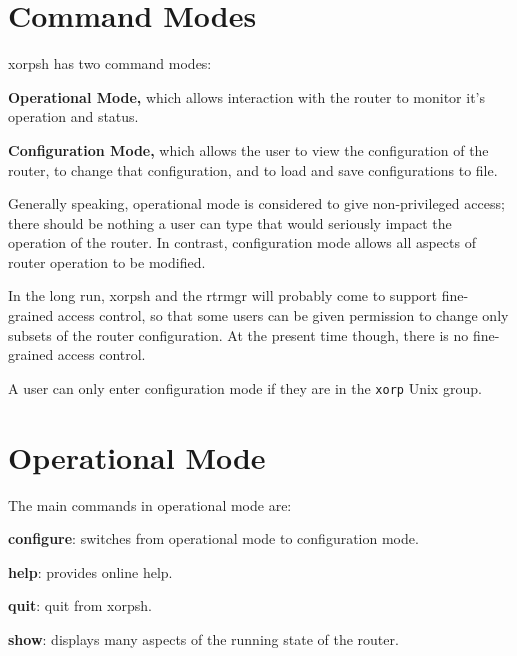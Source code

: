 \documentclass[11pt]{article}
\newcommand{\xorpsh}{{\sf\small xorpsh}\xspace}
\begin{document}
\newpage
\section{Command Modes}

\xorpsh has two command modes:
\begin{description}
\item{\bf Operational Mode,}  which allows interaction with the router
to monitor it's operation and status.
\item{\bf Configuration Mode,} which allows the user to view the
configuration of the router, to change that configuration, and to
load and save configurations to file.
\end{description}
Generally speaking, operational mode is considered to give
non-privileged access; there should be nothing a user can type that
would seriously impact the operation of the router.  In contrast,
configuration mode allows all aspects of router operation to be
modified.

In the long run, \xorpsh and the rtrmgr will probably come to support
fine-grained access control, so that some users can be given
permission to change only subsets of the router configuration.  At the
present time though, there is no fine-grained access control.

A user can only enter configuration mode if they are in the {\tt xorp} Unix
group.

\newpage
\section{Operational Mode}
\noindent{}
\vspace{0.1in}

The main commands in operational mode are:
\begin{description}
\item{\bf configure}: switches from operational mode to configuration
mode.
\item{\bf help}: provides online help.
\item{\bf quit}: quit from xorpsh.
\item{\bf show}: displays many aspects of the running state of the
router.
\end{description}
\end{document}
